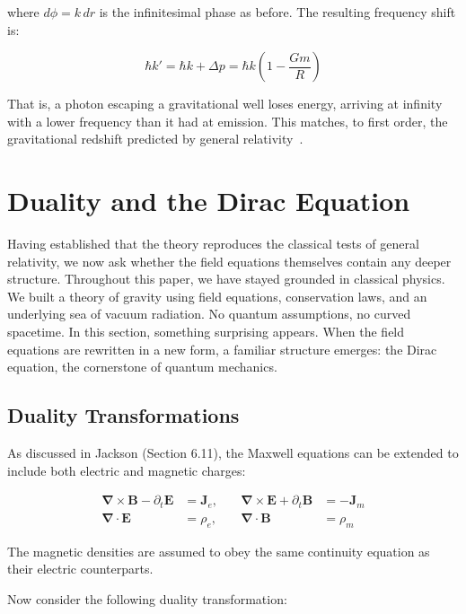 \documentclass {article}
\renewcommand\vec{\mathbf}
\let\OldS\nabla
\renewcommand{\nabla}{\boldsymbol{\OldS}}
\begin{document}
\noindent where $d\phi = k\,dr$ is the infinitesimal phase as before. The resulting frequency shift is:

\begin{equation}
\hbar k' = \hbar k + \Delta p = \hbar k \left( 1 - \frac{G m}{R} \right)
\end{equation}

\noindent That is, a photon escaping a gravitational well loses energy, arriving at infinity with a lower frequency than it had at emission. This matches, to first order, the gravitational redshift predicted by general relativity~\cite{hartle}.

		
\section{Duality and the Dirac Equation}

Having established that the theory reproduces the classical tests of general relativity, we now ask whether the field equations themselves contain any deeper structure. Throughout this paper, we have stayed grounded in classical physics. We built a theory of gravity using field equations, conservation laws, and an underlying sea of vacuum radiation. No quantum assumptions, no curved spacetime. In this section, something surprising appears. When the field equations are rewritten in a new form, a familiar structure emerges: the Dirac equation, the cornerstone of quantum mechanics.

\subsection{Duality Transformations}

As discussed in Jackson \cite{jackson} (Section 6.11), the Maxwell equations can be extended to include both electric and magnetic charges:

\begin{equation}
\begin{aligned}
\nabla \times \vec{B} - \partial_t \vec{E} &= \vec{J}_e, \quad
&\nabla \times \vec{E} + \partial_t \vec{B} &= -\vec{J}_m \\
\nabla \cdot \vec{E} &= \rho_e, \quad
&\nabla \cdot \vec{B} &= \rho_m
\end{aligned}
\end{equation}

The magnetic densities are assumed to obey the same continuity equation as their electric counterparts.

Now consider the following duality transformation:
\end{document}
